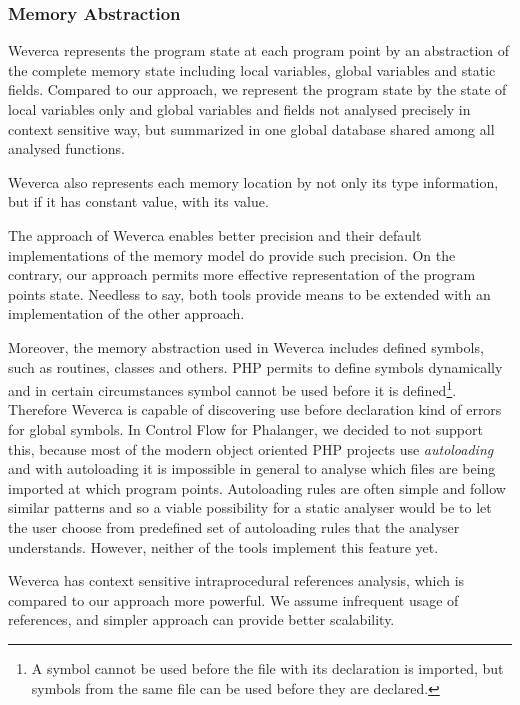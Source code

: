     \subsubsection*{Memory Abstraction}
    Weverca represents the program state at each program point by 
    an abstraction of the complete memory state including local 
    variables, global variables and static fields. Compared 
    to our approach, we represent the program state by the state 
    of local variables only and global variables and fields not 
    analysed precisely in context sensitive way, but summarized 
    in one global database shared among all analysed functions.
    
    Weverca also represents each memory location by not only 
    its type information, but if it has constant value, 
    with its value.
    
    The approach of Weverca enables better precision and 
    their default implementations of the memory model do 
    provide such precision. On the contrary, our approach 
    permits more effective representation of the program 
    points state. Needless to say, both tools provide means 
    to be extended with an implementation of the other 
    approach.
        
    Moreover, the memory abstraction used in Weverca includes 
    defined symbols, such as routines, classes and others. 
    PHP permits to define symbols dynamically and in certain circumstances 
    symbol cannot be used before it is defined\footnote{A symbol 
    cannot be used before the file with its declaration is imported, 
    but symbols from the same file can be used before they are declared.}. 
    Therefore Weverca is capable of discovering use before 
    declaration kind of errors for global symbols. In Control 
    Flow for Phalanger, we decided to not support this, 
    because most of the modern object oriented PHP projects 
    use \emph{autoloading} and with 
    autoloading it is impossible in general to analyse which 
    files are being imported at which program points. 
    Autoloading rules are often simple and follow 
    similar patterns and so a viable possibility for a static 
    analyser would be to let the user choose from predefined 
    set of autoloading rules that the analyser understands. 
    However, neither of the tools implement this feature yet.
    
    Weverca has context sensitive intraprocedural references 
    analysis, which is compared to our approach more powerful. 
    We assume infrequent usage of references, and simpler 
    approach can provide better scalability.
    
